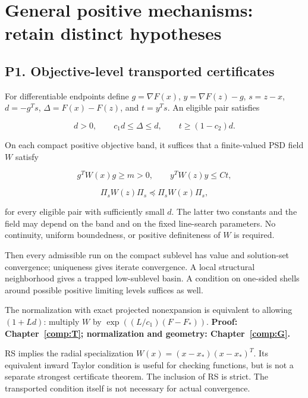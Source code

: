 

\section{General positive mechanisms: retain distinct hypotheses}\label{general-positive-mechanisms-retain-distinct-hypotheses}



\subsection{P1. Objective-level transported certificates}\label{p1.-objective-level-transported-certificates}

For differentiable endpoints define \(g=\nabla F(x)\), \(y=\nabla F(z)-g\), \(s=z-x\), \(d=-g^Ts\), \(\Delta=F(x)-F(z)\), and \(t=y^Ts\). An eligible pair satisfies

\[d>0,\qquad c_1d\le\Delta\le d,\qquad t\ge(1-c_2)d.\]

On each compact positive objective band, it suffices that a finite-valued PSD field \(W\) satisfy

\[g^TW(x)g\ge m>0,\qquad y^TW(z)y\le Ct,\]

\[\Pi_sW(z)\Pi_s\preceq\Pi_sW(x)\Pi_s,\]

for every eligible pair with sufficiently small \(d\). The latter two constants and the field may depend on the band and on the fixed line-search parameters. No continuity, uniform boundedness, or positive definiteness of \(W\) is required.

Then every admissible run on the compact sublevel has value and solution-set convergence; uniqueness gives iterate convergence. A local structural neighborhood gives a trapped low-sublevel basin. A condition on one-sided shells around possible positive limiting levels suffices as well.

The normalization with exact projected nonexpansion is equivalent to allowing \((1+Ld)\): multiply \(W\) by \(\exp((L/c_1)(F-F_*))\). \textbf{Proof: Chapter~\ref{comp:T}; normalization and geometry: Chapter~\ref{comp:G}.}

RS implies the radial specialization \(W(x)=(x-x_*)(x-x_*)^T\). Its equivalent inward Taylor condition is useful for checking functions, but is not a separate strongest certificate theorem. The inclusion of RS is strict. The transported condition itself is not necessary for actual convergence.

